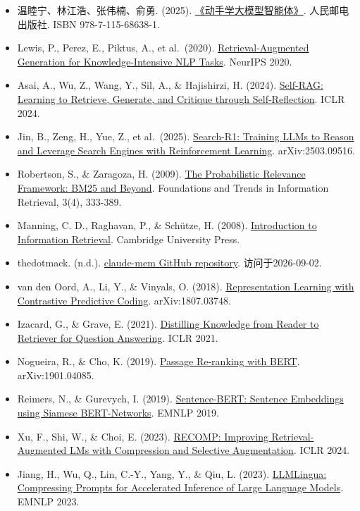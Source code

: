 \vspace{0.25em}
\begin{itemize}
\tightlist
\item
  温睦宁、林江浩、张伟楠、俞勇. (2025). \href{https://haa.boyuai.com/}{《动手学大模型智能体》}. 人民邮电出版社. ISBN 978-7-115-68638-1.
\item
  Lewis, P., Perez, E., Piktus, A., et al.~(2020). \href{https://proceedings.neurips.cc/paper/2020/hash/6b493230-Abstract.html}{Retrieval-Augmented Generation for Knowledge-Intensive NLP Tasks}. NeurIPS 2020.
\item
  Asai, A., Wu, Z., Wang, Y., Sil, A., \& Hajishirzi, H. (2024). \href{https://openreview.net/forum?id=hSyW5go0v8}{Self-RAG: Learning to Retrieve, Generate, and Critique through Self-Reflection}. ICLR 2024.
\item
  Jin, B., Zeng, H., Yue, Z., et al.~(2025). \href{https://arxiv.org/abs/2503.09516}{Search-R1: Training LLMs to Reason and Leverage Search Engines with Reinforcement Learning}. arXiv:2503.09516.
\item
  Robertson, S., \& Zaragoza, H. (2009). \href{https://doi.org/10.1561/1500000019}{The Probabilistic Relevance Framework: BM25 and Beyond}. Foundations and Trends in Information Retrieval, 3(4), 333-389.
\item
  Manning, C. D., Raghavan, P., \& Schütze, H. (2008). \href{https://nlp.stanford.edu/IR-book/}{Introduction to Information Retrieval}. Cambridge University Press.
\item
  thedotmack. (n.d.). \href{https://github.com/thedotmack/claude-mem}{claude-mem GitHub repository}. 访问于2026-09-02.
\item
  van den Oord, A., Li, Y., \& Vinyals, O. (2018). \href{https://arxiv.org/abs/1807.03748}{Representation Learning with Contrastive Predictive Coding}. arXiv:1807.03748.
\item
  Izacard, G., \& Grave, E. (2021). \href{https://arxiv.org/abs/2012.04584}{Distilling Knowledge from Reader to Retriever for Question Answering}. ICLR 2021.
\item
  Nogueira, R., \& Cho, K. (2019). \href{https://arxiv.org/abs/1901.04085}{Passage Re-ranking with BERT}. arXiv:1901.04085.
\item
  Reimers, N., \& Gurevych, I. (2019). \href{https://arxiv.org/abs/1908.10084}{Sentence-BERT: Sentence Embeddings using Siamese BERT-Networks}. EMNLP 2019.
\item
  Xu, F., Shi, W., \& Choi, E. (2023). \href{https://arxiv.org/abs/2310.04408}{RECOMP: Improving Retrieval-Augmented LMs with Compression and Selective Augmentation}. ICLR 2024.
\item
  Jiang, H., Wu, Q., Lin, C.-Y., Yang, Y., \& Qiu, L. (2023). \href{https://arxiv.org/abs/2310.05736}{LLMLingua: Compressing Prompts for Accelerated Inference of Large Language Models}. EMNLP 2023.
\end{itemize}

\clearpage
